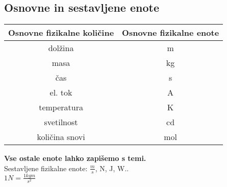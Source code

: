 {\color{indiagreen}\subsection{Osnovne in sestavljene enote}}
\begin{center}
	\begin{tabular}{|c c|} 
 	\hline
 	Osnovne fizikalne količine & Osnovne fizikalne enote \\
 	\hline
 	dolžina & m \\
 	masa & kg\\
 	čas & s\\
 	el. tok & A\\
 	temperatura & K\\
 	svetilnost & cd \\
 	količina snovi & mol\\
 	\hline
 	\end{tabular}
\end{center}

\textbf{Vse ostale enote lahko zapišemo s temi.}\\

Sestavljene fizikalne enote: $\frac{m}{s}$, N, J, W..\\

$1N = \frac{1kg m}{s^2}$